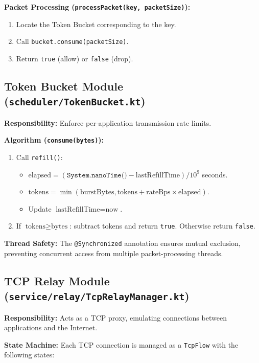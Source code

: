 \textbf{Packet Processing (\texttt{processPacket(key, packetSize)}):}
\begin{enumerate}
    \item Locate the Token Bucket corresponding to the key.
    \item Call \texttt{bucket.consume(packetSize)}.
    \item Return \texttt{true} (allow) or \texttt{false} (drop).
\end{enumerate}

\subsection{Token Bucket Module (\texttt{scheduler/TokenBucket.kt})}

\textbf{Responsibility:} Enforce per-application transmission rate limits.

\textbf{Algorithm (\texttt{consume(bytes)}):}
\begin{enumerate}
    \item Call \texttt{refill()}:
    \begin{itemize}
        \item $\text{elapsed} = (\texttt{System.nanoTime()} - \text{lastRefillTime}) / 10^9$ seconds.
        \item $\text{tokens} = \min(\text{burstBytes}, \text{tokens} + \text{rateBps} \times \text{elapsed})$.
        \item Update $\text{lastRefillTime} = \text{now}$.
    \end{itemize}
    \item If $\text{tokens} \geq \text{bytes}$: subtract tokens and return \texttt{true}. Otherwise return \texttt{false}.
\end{enumerate}

\textbf{Thread Safety:} The \texttt{@Synchronized} annotation ensures mutual exclusion, preventing concurrent access from multiple packet-processing threads.

\subsection{TCP Relay Module (\texttt{service/relay/TcpRelayManager.kt})}

\textbf{Responsibility:} Acts as a TCP proxy, emulating connections between applications and the Internet.

\textbf{State Machine:} Each TCP connection is managed as a \texttt{TcpFlow} with the following states:

